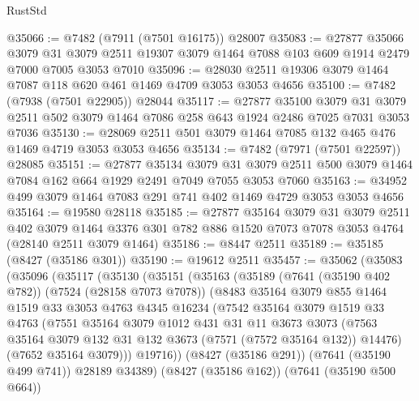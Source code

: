\begin{lexlean}{RustStd}
\begin{coremodule}
@35066 := @7482 (@7911 (@7501 @16175)) @28007
@35083 := @27877
    @35066
    @3079
    @31
    @3079
    @2511
    @19307
    @3079
    @1464
    @7088
    @103
    @609
    @1914
    @2479
    @7000
    @7005
    @3053
    @7010
@35096 := @28030 @2511 @19306 @3079 @1464 @7087 @118 @620 @461 @1469 @4709 @3053 @3053 @4656
@35100 := @7482 (@7938 (@7501 @22905)) @28044
@35117 := @27877
    @35100
    @3079
    @31
    @3079
    @2511
    @502
    @3079
    @1464
    @7086
    @258
    @643
    @1924
    @2486
    @7025
    @7031
    @3053
    @7036
@35130 := @28069 @2511 @501 @3079 @1464 @7085 @132 @465 @476 @1469 @4719 @3053 @3053 @4656
@35134 := @7482 (@7971 (@7501 @22597)) @28085
@35151 := @27877
    @35134
    @3079
    @31
    @3079
    @2511
    @500
    @3079
    @1464
    @7084
    @162
    @664
    @1929
    @2491
    @7049
    @7055
    @3053
    @7060
@35163 := @34952 @499 @3079 @1464 @7083 @291 @741 @402 @1469 @4729 @3053 @3053 @4656
@35164 := @19580 @28118
@35185 := @27877
    @35164
    @3079
    @31
    @3079
    @2511
    @402
    @3079
    @1464
    @3376
    @301
    @782
    @886
    @1520
    @7073
    @7078
    @3053
    @4764
    (@28140 @2511 @3079 @1464)
@35186 := @8447 @2511
@35189 := @35185 (@8427 (@35186 @301))
@35190 := @19612 @2511
@35457 := @35062
    (@35083
      (@35096
        (@35117
          (@35130
            (@35151
              (@35163
                (@35189
                  (@7641 (@35190 @402 @782))
                  (@7524 (@28158 @7073 @7078))
                  (@8483
                    @35164
                    @3079
                    @855
                    @1464
                    @1519
                    @33
                    @3053
                    @4763
                    @4345
                    @16234
                    (@7542
                      @35164
                      @3079
                      @1519
                      @33
                      @4763
                      (@7551
                        @35164
                        @3079
                        @1012
                        @431
                        @31
                        @11
                        @3673
                        @3073
                        (@7563 @35164 @3079 @132 @31 @132 @3673 (@7571 (@7572 @35164 @132)) @14476)
                        (@7652 @35164 @3079)))
                    @19716))
                (@8427 (@35186 @291))
                (@7641 (@35190 @499 @741))
                @28189
                @34389)
              (@8427 (@35186 @162))
              (@7641 (@35190 @500 @664))

\end{coremodule}
\end{lexlean}
